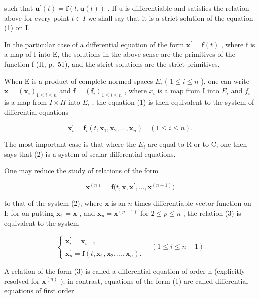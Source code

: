 such that \(\mathbf{u}^{\prime}(t)=\mathbf{f}(t,\mathbf{u}(t))\) . If u is differentiable and satisfies the relation above for every point \(t\in I\) we shall say that it is a strict solution of the equation (1) on I.

In the particular case of a differential equation of the form \(\mathbf{x}^{\prime}=\mathbf{f}(t)\) , where f is a map of I into E, the solutions in the above sense are the primitives of the function f (II, p.~51), and the strict solutions are the strict primitives.

When E is a product of complete normed spaces \(E_{i}\) ( \(1 \leqslant i \leqslant n\) ), one can write \(\mathbf{x} = (\mathbf{x}_{i})_{1 \leqslant i \leqslant n}\) and \(\mathbf{f} = (\mathbf{f}_{i})_{1 \leqslant i \leqslant n}\) , where \(x_{i}\) is a map from I into \(E_{i}\) and \(f_{i}\) is a map from \(I \times H\) into \(E_{i}\) ; the equation (1) is then equivalent to the system of differential equations

\[
\mathbf {x} _ {i} ^ {\prime} = \mathbf {f} _ {i} (t, \mathbf {x} _ {1}, \mathbf {x} _ {2}, \dots , \mathbf {x} _ {n}) \quad (1 \leqslant i \leqslant n).\tag{2}
\]

The most important case is that where the \(E_{i}\) are equal to R or to C; one then says that (2) is a system of scalar differential equations.

One may reduce the study of relations of the form

\[
\mathbf {x} ^ {(n)} = \mathbf {f} \big (t, \mathbf {x}, \mathbf {x} ^ {\prime}, \dots , \mathbf {x} ^ {(n - 1)} \big)\tag{3}
\]

to that of the system (2), where \(\mathbf{x}\) is an \(n\) times differentiable vector function on I; for on putting \(\mathbf{x}_1 = \mathbf{x}\) , and \(\mathbf{x}_p = \mathbf{x}^{(p - 1)}\) for \(2 \leqslant p \leqslant n\) , the relation (3) is equivalent to the system

\[
\left\{ \begin{array}{l} \mathbf {x} _ {i} ^ {\prime} = \mathbf {x} _ {i + 1} \\ \mathbf {x} _ {n} ^ {\prime} = \mathbf {f} (t, \mathbf {x} _ {1}, \mathbf {x} _ {2}, \ldots , \mathbf {x} _ {n}). \end{array} \right. \quad (1 \leqslant i \leqslant n - 1)\tag{4}
\]

A relation of the form (3) is called a differential equation of order n (explicitly resolved for \(\mathbf{x}^{(n)}\) ); in contrast, equations of the form (1) are called differential equations of first order.

